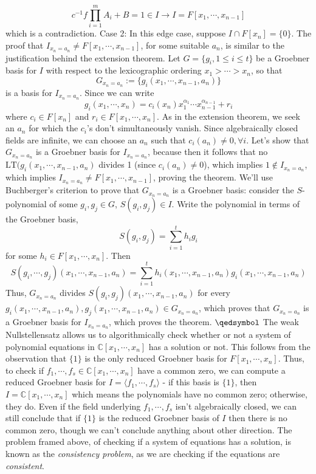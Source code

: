 \documentclass{article}
\newcommand*{\ti}{\textit}
\newcommand*{\n}{\newline}
\newcommand*{\nn}{\newline \newline}
\newcommand*{\Fx}{\ensuremath{F[x_1, \cdots, x_n]}}
\newcommand*{\fs}{f_1, \cdots, f_s}
\newcommand*{\lfsr}{\langle f_1, \cdots, f_s \rangle}
\begin{document}
$$ c^{-1} f \prod_{i = 1}^m A_i + B = 1 \in I \rightarrow I = F[x_1, \cdots, x_{n - 1}] $$
which is a contradiction.
\n
Case 2: In this edge case, suppose $ I \cap F[x_n] = \{ 0 \} $. The proof that $ I_{x_n = a_n} \neq F[x_1, \cdots, x_{n - 1}] $, for some suitable $ a_n $, is similar to the justification behind the extension theorem. Let $ G = \{ g_i, 1 \leq i \leq t \} $ be a Groebner basis for $ I $ with respect to the lexicographic ordering $ x_1 > \cdots > x_n $, so that
$$ G_{x_n = a_n} := \{ g_i(x_1, \cdots, x_{n - 1}, a_n) \} $$
is a basis for $ I_{x_n = a_n} $. Since we can write
$$ g_i(x_1, \cdots, x_n) = c_i(x_n) x_1^{\alpha_1} \cdots x_{n - 1}^{\alpha_{n - 1}} + r_i $$
where $ c_i \in F[x_n] $ and $ r_i \in \Fx $. As in the extension theorem, we seek an $ a_n $ for which the $ c_i $'s don't simultaneously vanish. Since algebraically closed fields are infinite, we can choose an $ a_n $ such that $ c_i(a_n) \neq 0, \forall i $.
\n
Let's show that $ G_{x_n = a_n} $ is a Groebner basis for $ I_{x_n = a_n} $, because then it follows that no $ \text{LT}(g_i(x_1, \cdots, x_{n - 1}, a_n) $ divides 1 (since $ c_i(a_n) \neq 0 $), which implies $ 1 \notin I_{x_n = a_n} $, which implies $ I_{x_n = a_n} \neq F[x_1, \cdots, x_{n - 1}] $, proving the theorem. We'll use Buchberger's criterion to prove that $ G_{x_n = a_n} $ is a Groebner basis: consider the $ S $-polynomial of some $ g_i, g_j \in G $, $ S(g_i, g_j) \in I $. Write the polynomial in terms of the Groebner basis,
$$ S(g_i, g_j) = \sum_{i = 1}^t h_i g_i $$
for some $ h_i \in \Fx $. Then
$$ S(g_i, \cdots, g_j)(x_1, \cdots, x_{n - 1}, a_n) = \sum_{i = 1}^t h_i(x_1, \cdots, x_{n - 1}, a_n) g_i(x_1, \cdots, x_{n - 1}, a_n) $$
Thus, $ G_{x_n = a_n} $ divides $ S(g_i, g_j)(x_1, \cdots, x_{n - 1}, a_n) $ for every $ g_i(x_1, \cdots, x_{n - 1}, a_n), g_j(x_1, \cdots, x_{n - 1}, a_n) \in G_{x_n = a_n} $, which proves that $ G_{x_n = a_n} $ is a Groebner basis for $ I_{x_n = a_n} $, which proves the theorem. $ \qedsymbol $
\nn
The weak Nullstellensatz allows us to algorithmically check whether or not a system of polynomial equations in $ \mathbb{C}[x_1, \cdots, x_n] $ has a solution or not. This follows from the observation that $ \{ 1 \} $ is the only reduced Groebner basis for $ \Fx $. Thus, to check if $ \fs \in \mathbb{C}[x_1, \cdots, x_n] $ have a common zero, we can compute a reduced Groebner basis for $ I = \lfsr $ - if this basis is $ \{ 1 \} $, then $ I = \mathbb{C}[x_1, \cdots, x_n] $ which means the polynomials have no common zero; otherwise, they do. Even if the field underlying $ \fs $ isn't algebraically closed, we can still conclude that if $ \{ 1 \} $ is the reduced Groebner basis of $ I $ then there is no common zero, though we can't conclude anything about other direction. The problem framed above, of checking if a system of equations has a solution, is known as the \ti{consistency problem}, as we are checking if the equations are \ti{consistent}.
\end{document}
